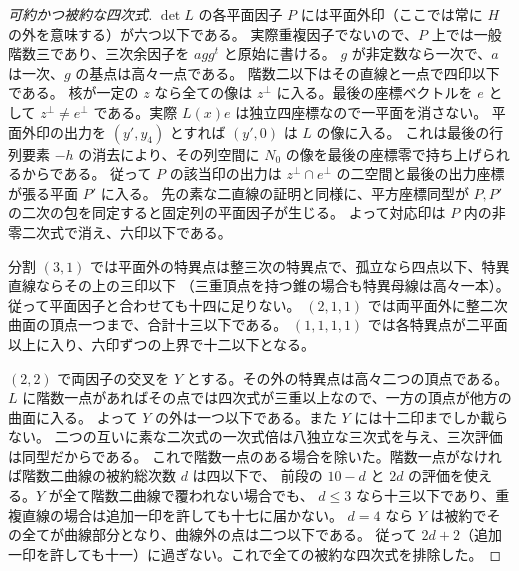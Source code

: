 \begin{proof}[可約かつ被約な四次式]
$\det L$ の各平面因子 $P$ には平面外印（ここでは常に $H$ の外を意味する）が六つ以下である。
実際重複因子でないので、$P$ 上では一般階数三であり、三次余因子を $a gg^t$ と原始に書ける。
$g$ が非定数なら一次で、$a$ は一次、$g$ の基点は高々一点である。
階数二以下はその直線と一点で四印以下である。
核が一定の $z$ なら全ての像は $z^\perp$ に入る。最後の座標ベクトルを $e$ として
$z^\perp\ne e^\perp$ である。実際 $L(x)e$ は独立四座標なので一平面を消さない。
平面外印の出力を $(y',y_4)$ とすれば $(y',0)$ は $L$ の像に入る。
これは最後の行列要素 $-h$ の消去により、その列空間に $N_0$ の像を最後の座標零で持ち上げられるからである。
従って $P$ の該当印の出力は $z^\perp\cap e^\perp$ の二空間と最後の出力座標が張る平面 $P'$ に入る。
先の素な二直線の証明と同様に、平方座標同型が $P,P'$ の二次の包を同定すると固定列の平面因子が生じる。
よって対応印は $P$ 内の非零二次式で消え、六印以下である。

分割 $(3,1)$ では平面外の特異点は整三次の特異点で、孤立なら四点以下、特異直線ならその上の三印以下
（三重頂点を持つ錐の場合も特異母線は高々一本）。従って平面因子と合わせても十四に足りない。
$(2,1,1)$ では両平面外に整二次曲面の頂点一つまで、合計十三以下である。
$(1,1,1,1)$ では各特異点が二平面以上に入り、六印ずつの上界で十二以下となる。

$(2,2)$ で両因子の交叉を $Y$ とする。その外の特異点は高々二つの頂点である。
$L$ に階数一点があればその点では四次式が三重以上なので、一方の頂点が他方の曲面に入る。
よって $Y$ の外は一つ以下である。また $Y$ には十二印までしか載らない。
二つの互いに素な二次式の一次式倍は八独立な三次式を与え、三次評価は同型だからである。
これで階数一点のある場合を除いた。階数一点がなければ階数二曲線の被約総次数 $d$ は四以下で、
前段の $10-d$ と $2d$ の評価を使える。$Y$ が全て階数二曲線で覆われない場合でも、
$d\le3$ なら十三以下であり、重複直線の場合は追加一印を許しても十七に届かない。
$d=4$ なら $Y$ は被約でその全てが曲線部分となり、曲線外の点は二つ以下である。
従って $2d+2$（追加一印を許しても十一）に過ぎない。これで全ての被約な四次式を排除した。
\end{proof}

